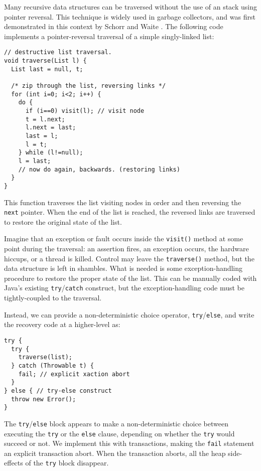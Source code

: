 \documentclass[preprint]{rdbacmconf}
\begin{document}
Many recursive data structures can be traversed without the use of an
stack using pointer reversal.  This technique is widely used in
garbage collectors, and was first demonstrated in this context by
Schorr and Waite \cite{SchorrWa67}.  The following code implements a
pointer-reversal traversal of a simple singly-linked list:
 \par {\footnotesize\samepage
\begin{verbatim}
// destructive list traversal.
void traverse(List l) {
  List last = null, t;
  
  /* zip through the list, reversing links */
  for (int i=0; i<2; i++) {
    do {
      if (i==0) visit(l); // visit node
      t = l.next;
      l.next = last;
      last = l;
      l = t;
    } while (l!=null);
    l = last;
    // now do again, backwards. (restoring links)
  }
}
\end{verbatim}
}
This function traverses the list visiting nodes in order and then
reversing the {\tt next} pointer.  When the end of the list is
reached, the reversed links are traversed to restore the original
state of the list.

Imagine that an exception or fault occurs inside the {\tt visit()} method
at some point during the traversal: an assertion fires, an exception
occurs, the hardware hiccups, or a thread is killed.  Control may
leave the {\tt traverse()} method, but the data structure is left in
shambles.  What is needed is some exception-handling procedure to
restore the proper state of the list.  This can be manually coded with
Java's existing {\tt try}/{\tt catch} construct, but the
exception-handling code must be tightly-coupled to the traversal.

Instead, we can provide a non-deterministic choice operator,
{\tt try}/{\tt else}, and write the recovery code at a higher-level as:
\par {\footnotesize\samepage
\begin{verbatim}
try {
  try {
    traverse(list);
  } catch (Throwable t) {
    fail; // explicit xaction abort
  }
} else { // try-else construct
  throw new Error();
}
\end{verbatim}
}

The {\tt try}/{\tt else} block appears to make a non-deterministic
choice between executing the {\tt try} or the {\tt else} clause,
depending on whether the {\tt try} would succeed or not.
We implement this with transactions, making the {\tt fail} statement
an explicit transaction abort.  When the transaction aborts, all the
heap side-effects of the {\tt try} block disappear.
\end{document}

